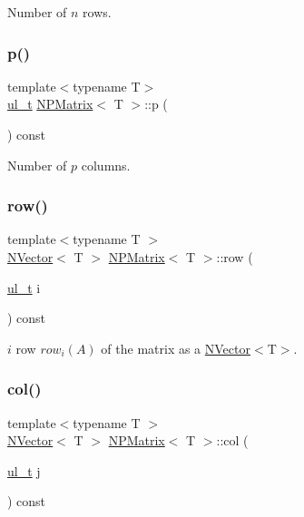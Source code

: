 Number of $ n $ rows. 

\mbox{\label{class_n_p_matrix_a3beee8acb5babf62d2b4f212ac5d18e8}} 
\subsubsection{\texorpdfstring{p()}{p()}}
{\footnotesize\ttfamily template$<$typename T$>$ \\
\mbox{\hyperlink{typedef_8h_a1b140a2034db3f5dfe18a987745df43a}{ul\+\_\+t}} \mbox{\hyperlink{class_n_p_matrix}{N\+P\+Matrix}}$<$ T $>$\+::p (\begin{DoxyParamCaption}{ }\end{DoxyParamCaption}) const\hspace{0.3cm}{\ttfamily [inline]}}



Number of $ p $ columns. 

\mbox{\label{class_n_p_matrix_a99ae2d8850ecdb33fbd9a71804ab4ea7}} 
\subsubsection{\texorpdfstring{row()}{row()}}
{\footnotesize\ttfamily template$<$typename T $>$ \\
\mbox{\hyperlink{class_n_vector}{N\+Vector}}$<$ T $>$ \mbox{\hyperlink{class_n_p_matrix}{N\+P\+Matrix}}$<$ T $>$\+::row (\begin{DoxyParamCaption}\item[{\mbox{\hyperlink{typedef_8h_a1b140a2034db3f5dfe18a987745df43a}{ul\+\_\+t}}}]{i }\end{DoxyParamCaption}) const}



$ i $ row $row_i(A) $ of the matrix as a {\ttfamily \mbox{\hyperlink{class_n_vector}{N\+Vector}}$<$T$>$}. 

\mbox{\label{class_n_p_matrix_aa137db97da518f1dfb69e7eb8fa1b94d}} 
\subsubsection{\texorpdfstring{col()}{col()}}
{\footnotesize\ttfamily template$<$typename T $>$ \\
\mbox{\hyperlink{class_n_vector}{N\+Vector}}$<$ T $>$ \mbox{\hyperlink{class_n_p_matrix}{N\+P\+Matrix}}$<$ T $>$\+::col (\begin{DoxyParamCaption}\item[{\mbox{\hyperlink{typedef_8h_a1b140a2034db3f5dfe18a987745df43a}{ul\+\_\+t}}}]{j }\end{DoxyParamCaption}) const}



